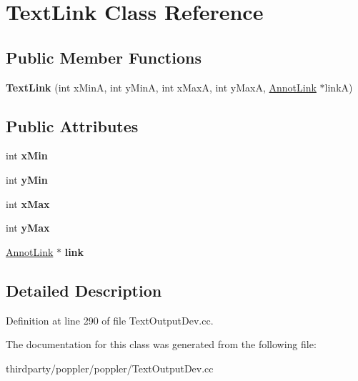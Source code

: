 \hypertarget{class_text_link}{}\section{Text\+Link Class Reference}
\label{class_text_link}
\subsection*{Public Member Functions}
\begin{DoxyCompactItemize}
\item 
\mbox{\label{class_text_link_ad2c308fad03c76325b4bab9b5b88bd21}} 
{\bfseries Text\+Link} (int x\+MinA, int y\+MinA, int x\+MaxA, int y\+MaxA, \hyperlink{class_annot_link}{Annot\+Link} $\ast$linkA)
\end{DoxyCompactItemize}
\subsection*{Public Attributes}
\begin{DoxyCompactItemize}
\item 
\mbox{\label{class_text_link_ab396ff3b4550c398c3944ab5385c21e3}} 
int {\bfseries x\+Min}
\item 
\mbox{\label{class_text_link_a04ab064f95d45cca8edf0f49fc9b7759}} 
int {\bfseries y\+Min}
\item 
\mbox{\label{class_text_link_abfb208943e684d5d45c714879e7b1b36}} 
int {\bfseries x\+Max}
\item 
\mbox{\label{class_text_link_aa3d1ecf17f1bb87996eed25b9b95f3fd}} 
int {\bfseries y\+Max}
\item 
\mbox{\label{class_text_link_afcce44f977d198b05d78fea0d0b63de6}} 
\hyperlink{class_annot_link}{Annot\+Link} $\ast$ {\bfseries link}
\end{DoxyCompactItemize}


\subsection{Detailed Description}


Definition at line 290 of file Text\+Output\+Dev.\+cc.



The documentation for this class was generated from the following file\+:\begin{DoxyCompactItemize}
\item 
thirdparty/poppler/poppler/Text\+Output\+Dev.\+cc\end{DoxyCompactItemize}
